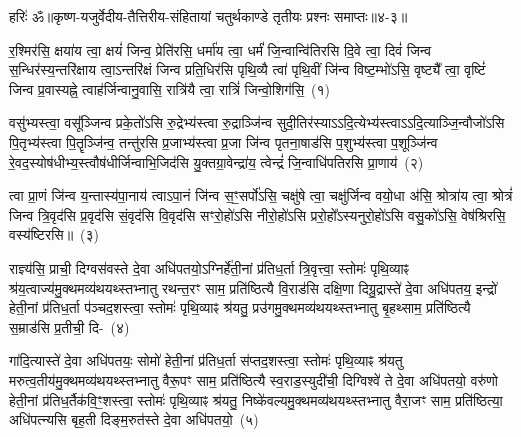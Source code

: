 {\anuvakamend[{सूर्य॑स्य॒ मनु॑षो मरुतः॒ पाव॑क॒ महो॑भी रथे॒शुभं॒ केन॒ षट्च॑त्वारिꣳशच्च}]}%

{हरिः॑ ॐ}{॥कृष्ण-यजुर्वेदीय-तैत्तिरीय-संहितायां चतुर्थकाण्डे तृतीयः प्रश्नः समाप्तः॥४-३॥}



\setcounter{anuvakam}{0}
र॒श्मिर॑सि॒ क्षया॑य त्वा॒ क्षयं॑ जिन्व॒ प्रेति॑रसि॒ धर्मा॑य त्वा॒ धर्मं॑ जि॒न्वान्वि॑तिरसि दि॒वे त्वा॒ दिवं॑ जिन्व स॒न्धिर॑स्य॒न्तरि॑क्षाय त्वा॒ऽन्तरि॑क्षं जिन्व प्रति॒धिर॑सि पृथि॒व्यै त्वा॑ पृथि॒वीं जि॑न्व विष्ट॒म्भो॑\-ऽसि॒ वृष्ट्यै᳚ त्वा॒ वृष्टिं॑ जिन्व प्र॒वास्यह्ने॒ त्वाह॑र्जिन्वानु॒वासि॒ रात्रि॑यै त्वा॒ रात्रिं॑ जिन्वो॒शिग॑सि॒~(१)\ip

वसु॑भ्यस्त्वा॒ वसू᳚ञ्जिन्व प्रके॒तो॑\-ऽसि रु॒द्रेभ्य॑स्त्वा रु॒द्राञ्जि॑न्व सुदी॒तिर॑स्याऽऽदि॒त्येभ्य॑स्त्वा\-ऽऽ\-दि॒त्याञ्जि॒न्वौजो॑\-ऽसि पि॒तृभ्य॑स्त्वा पि॒तॄञ्जि॑न्व॒ तन्तु॑रसि प्र॒जाभ्य॑स्त्वा प्र॒जा जि॑न्व पृतना॒षाड॑सि प॒शुभ्य॑स्त्वा प॒शूञ्जि॑न्व रे॒वद॒स्योष॑धीभ्य॒स्त्वौष॑धीर्जिन्वाभि॒जिद॑सि यु॒क्तग्रा॒वेन्द्रा॑य॒ त्वेन्द्रं॑ जि॒न्वाधि॑\-पतिरसि प्रा॒णाय॑~(२)\ip

त्वा प्रा॒णं जि॑न्व य॒न्तास्य॑पा॒नाय॑ त्वाऽपा॒नं जि॑न्व स॒ꣳ॒सर्पो॑\-ऽसि॒ चक्षु॑षे त्वा॒ चक्षु॑र्जिन्व वयो॒धा अ॑सि॒ श्रोत्रा॑य त्वा॒ श्रोत्रं॑ जिन्व त्रि॒वृद॑सि प्र॒वृद॑सि सं॒वृद॑सि वि॒वृद॑सि सꣳरो॒हो॑\-ऽसि नीरो॒हो॑\-ऽसि प्ररो॒हो᳚\-ऽस्यनुरो॒हो॑\-ऽसि वसु॒को॑\-ऽसि॒ वेष॑श्रिरसि॒ वस्य॑ष्टिरसि॥~(३)\ip

{\anuvakamend[{उ॒शिग॑सि प्रा॒णाय॒ त्रिच॑त्वारिꣳशच्च}]}

राज्ञ्य॑सि॒ प्राची॒ दिग्वस॑वस्ते दे॒वा अधि॑पतयो॒\-ऽग्निर्\mbox{}हे॑ती॒नां प्र॑तिध॒र्ता त्रि॒वृत्त्वा॒ स्तोमः॑ पृथि॒व्याꣴ श्र॑य॒त्वाज्य॑मु॒क्थ\-मव्य॑थयथ्स्तभ्नातु रथन्त॒रꣳ साम॒ प्रति॑ष्ठित्यै वि॒राड॑सि दक्षि॒णा दिग्रु॒द्रास्ते॑ दे॒वा अधि॑पतय॒ इन्द्रो॑ हेती॒नां प्र॑तिध॒र्ता प॑ञ्चद॒शस्त्वा॒ स्तोमः॑ पृथि॒व्याꣴ श्र॑यतु॒ प्रउ॑गमु॒क्थमव्य॑थयथ्स्तभ्नातु बृ॒हथ्साम॒ प्रति॑ष्ठित्यै स॒म्राड॑सि प्र॒तीची॒ दि-~(४)\ip

गा॑दि॒त्यास्ते॑ दे॒वा अधि॑पतयः॒ सोमो॑ हेती॒नां प्र॑तिध॒र्ता स॑प्तद॒शस्त्वा॒ स्तोमः॑ पृथि॒व्याꣴ श्र॑यतु मरुत्व॒तीय॑मु॒क्थ\-मव्य॑थयथ्स्तभ्नातु वैरू॒पꣳ साम॒ प्रति॑ष्ठित्यै स्व॒राड॒स्युदी॑ची॒ दिग्विश्वे॑ ते दे॒वा अधि॑पतयो॒ वरु॑णो हेती॒नां प्र॑तिध॒र्तैक॑\-वि॒ꣳ॒शस्त्वा॒ स्तोमः॑ पृथि॒व्याꣴ श्र॑यतु॒ निष्के॑वल्यमु॒क्थमव्य॑थयथ्स्तभ्नातु वैरा॒जꣳ साम॒ प्रति॑ष्ठित्या॒ अधि॑पत्न्यसि बृह॒ती दिङ्म॒रुत॑स्ते दे॒वा अधि॑पतयो॒~(५)\ip

